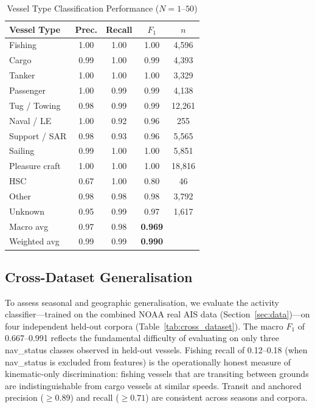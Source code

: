\documentclass[journal]{IEEEtran}
\begin{document}
\begin{table}[!t]
  \caption{Vessel Type Classification Performance ($N = 1$--$50$)}
  \label{tab:vtype_results}
  \centering
  \begin{tabular}{lcccc}
    \toprule
    Vessel Type & Prec. & Recall & $F_1$ & $n$ \\
    \midrule
    Fishing         & 1.00 & 1.00 & 1.00 & 4,596 \\
    Cargo           & 0.99 & 1.00 & 0.99 & 4,393 \\
    Tanker          & 1.00 & 1.00 & 1.00 & 3,329 \\
    Passenger       & 1.00 & 0.99 & 0.99 & 4,138 \\
    Tug / Towing    & 0.98 & 0.99 & 0.99 & 12,261 \\
    Naval / LE      & 1.00 & 0.92 & 0.96 & 255 \\
    Support / SAR   & 0.98 & 0.93 & 0.96 & 5,565 \\
    Sailing         & 0.99 & 1.00 & 1.00 & 5,851 \\
    Pleasure craft  & 1.00 & 1.00 & 1.00 & 18,816 \\
    HSC             & 0.67 & 1.00 & 0.80 & 46 \\
    Other           & 0.98 & 0.98 & 0.98 & 3,792 \\
    Unknown         & 0.95 & 0.99 & 0.97 & 1,617 \\
    \midrule
    Macro avg       & 0.97 & 0.98 & \textbf{0.969} & \\
    Weighted avg    & 0.99 & 0.99 & \textbf{0.990} & \\
    \bottomrule
  \end{tabular}
\end{table}

\subsection{Cross-Dataset Generalisation}

To assess seasonal and geographic generalisation, we evaluate the
activity classifier—trained on the combined NOAA real AIS data
(Section~\ref{sec:data})—on four independent held-out corpora
(Table~\ref{tab:cross_dataset}).
The macro $F_1$ of 0.667--0.991 reflects the fundamental difficulty of
evaluating on only three nav\_status classes observed in held-out
vessels.
Fishing recall of 0.12--0.18 (when nav\_status is excluded from
features) is the operationally honest measure of kinematic-only
discrimination: fishing vessels that are transiting between grounds
are indistinguishable from cargo vessels at similar speeds.
Transit and anchored precision ($\geq 0.89$) and recall ($\geq 0.71$)
are consistent across seasons and corpora.
\end{document}
